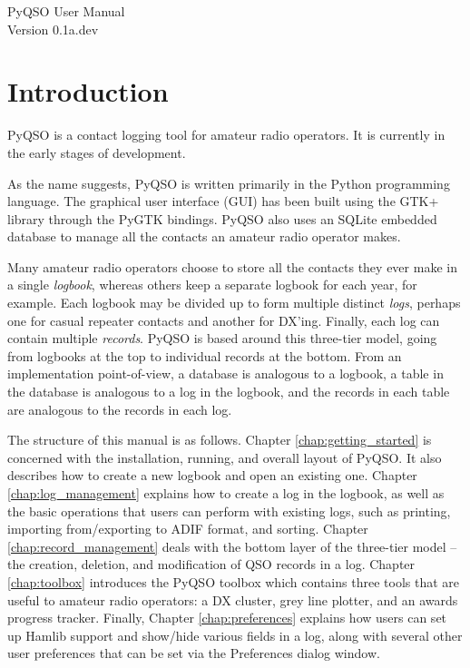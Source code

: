 \documentclass[11pt, a4paper]{report}
\begin{document}
\begin{titlepage}
\begin{center}
\vspace*{5cm}
\huge{PyQSO User Manual}\\\vspace*{5cm}
\LARGE{Version 0.1a.dev}
\end{center}
\end{titlepage}

\tableofcontents

\chapter{Introduction}\label{chap:introduction}
PyQSO is a contact logging tool for amateur radio operators. It is currently in the early stages of development.

As the name suggests, PyQSO is written primarily in the Python programming language. The graphical user interface (GUI) has been built using the GTK+ library through the PyGTK bindings. PyQSO also uses an SQLite embedded database to manage all the contacts an amateur radio operator makes.

Many amateur radio operators choose to store all the contacts they ever make in a single \textit{logbook}, whereas others keep a separate logbook for each year, for example. Each logbook may be divided up to form multiple distinct \textit{logs}, perhaps one for casual repeater contacts and another for DX'ing. Finally, each log can contain multiple \textit{records}. PyQSO is based around this three-tier model, going from logbooks at the top to individual records at the bottom. From an implementation point-of-view, a database is analogous to a logbook, a table in the database is analogous to a log in the logbook, and the records in each table are analogous to the records in each log.

The structure of this manual is as follows. Chapter \ref{chap:getting_started} is concerned with the installation, running, and overall layout of PyQSO. It also describes how to create a  new logbook and open an existing one. Chapter \ref{chap:log_management} explains how to create a log in the logbook, as well as the basic operations that users can perform with existing logs, such as printing, importing from/exporting to ADIF format, and sorting. Chapter \ref{chap:record_management} deals with the bottom layer of the three-tier model -- the creation, deletion, and modification of QSO records in a log. Chapter \ref{chap:toolbox} introduces the PyQSO toolbox which contains three tools that are useful to amateur radio operators: a DX cluster, grey line plotter, and an awards progress tracker. Finally, Chapter \ref{chap:preferences} explains how users can set up Hamlib support and show/hide various fields in a log, along with several other user preferences that can be set via the Preferences dialog window.
\end{document}
